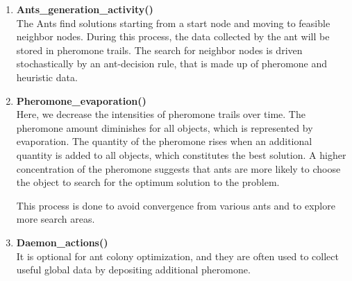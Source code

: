 \documentclass[conference]{IEEEtran}
\begin{document}
\begin{enumerate}
	\item \textbf{Ants\_generation\_activity()}\\
	The Ants find solutions starting from a start node and moving to feasible neighbor nodes. During this process, the data collected by the ant will be stored in pheromone trails. The search for neighbor nodes is driven stochastically by an ant-decision rule, that is made up of pheromone and heuristic data.
	\item \textbf{Pheromone\_evaporation()}\\
	Here, we decrease the intensities of pheromone trails over time. The pheromone amount diminishes for all objects, which is represented by evaporation. The quantity of the pheromone rises when an additional quantity is added to all objects, which constitutes the best solution. A higher concentration of the pheromone suggests that ants are more likely to choose the object to search for the optimum solution to the problem.\par
	This process is done to avoid convergence from various ants and to explore more search areas.
	\item \textbf{Daemon\_actions()}\\
	It is optional for ant colony optimization, and they are often used to collect useful global data by depositing additional pheromone.
\end{enumerate}
\end{document}
